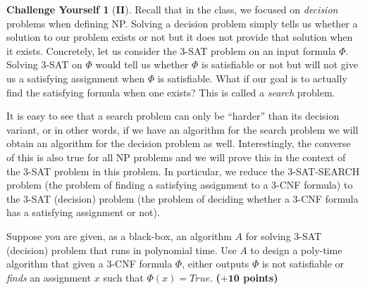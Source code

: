 \documentclass{article}
\theoremstyle{definition}
\newtheorem*{challenge}{Challenge Yourself}
\newcommand{\grade}[1]{\hfill{\textbf{($\mathbf{#1}$ points)}}}
\begin{document}
\bigskip

\begin{challenge}[\textbf{II}] 
	Recall that in the class, we  focused on \emph{decision} problems when defining NP. Solving a decision problem simply tells us whether a solution to our problem exists or not but  it does not provide that solution when it 
	exists. Concretely, let us consider the 3-SAT problem on an input formula $\Phi$. Solving 3-SAT on $\Phi$ would  tell us whether $\Phi$ is satisfiable or not but will not give us a satisfying assignment when $\Phi$ is satisfiable. 
	What if our goal is to actually find the satisfying formula when one exists? This is called a \emph{search} problem. 
	
	It is easy to see that a search problem can only be ``harder'' than its decision variant, or in other words, if we have an algorithm for the search problem we will obtain an algorithm for the decision problem as well. Interestingly, the converse 
	of this is also true for all NP problems and we will prove this in the context of the 3-SAT problem in this problem. In particular, we reduce the 3-SAT-SEARCH problem (the problem of finding a satisfying assignment to a 3-CNF formula) 
	to the 3-SAT (decision) problem (the problem of deciding whether a 3-CNF formula has a satisfying assignment or not). 
	
	Suppose you are given, as a black-box, an algorithm $A$ for solving 3-SAT (decision) problem that runs in polynomial time. Use $A$ to design a poly-time algorithm that given a 3-CNF formula $\Phi$, either outputs $\Phi$ is not satisfiable or 
	\emph{finds} an assignment $x$ such that $\Phi(x) = True$. \grade{+10}
\end{challenge}
\end{document}
